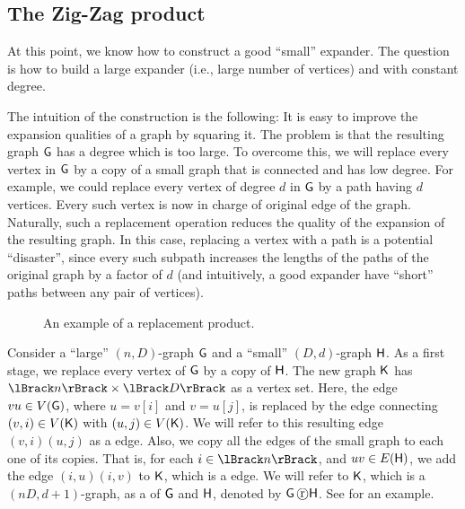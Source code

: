 \subsection{The Zig-Zag product}

At this point, we know how to construct a good ``small'' expander. The
question is how to build a large expander (i.e., large number of
vertices) and with constant degree.

The intuition of the construction is the following: It is easy to
improve the expansion qualities of a graph by squaring it. The problem
is that the resulting graph $\mathsf{G}$ has a degree which is too
large. To overcome this, we will replace every vertex in $\mathsf{G}$ by a
copy of a small graph that is connected and has low degree. For
example, we could replace every vertex of degree $d$ in $\mathsf{G}$ by a
path having $d$ vertices. Every such vertex is now in charge of
original edge of the graph. Naturally, such a replacement operation
reduces the quality of the expansion of the resulting graph. In this
case, replacing a vertex with a path is a potential ``disaster'',
since every such subpath increases the lengths of the paths of the
original graph by a factor of $d$ (and intuitively, a good expander
have ``short'' paths between any pair of vertices).

\begin{figure}[t]
    \centering
    \caption{An example of a replacement product.}
\end{figure}


Consider a ``large'' $(n,D)$-graph $\mathsf{G}$ and a ``small'' $(D,d)$-graph
$\mathsf{H}$. As a first stage, we replace every vertex of $\mathsf{G}$ by a
copy of $\mathsf{H}$.  The new graph $\mathsf{K}$ has
$\RangeI{n}\times\RangeI{D}$ as a vertex set.  Here, the edge
$v u \in V(\mathsf{G})$, where $u=v[i]$ and $v=u[j]$, is replaced by the edge
connecting $(v,i) \in V(\mathsf{K})$ with $(u,j) \in V(\mathsf{K})$. We will refer
to this resulting edge $(v,i)(u,j)$ as a 
edge. Also, we copy all the edges of the small graph to each one of its
copies. That is, for each $i\in \RangeI{n}$, and $uv \in E(\mathsf{H})$, we add
the edge $(i,u) (i,v)$ to $\mathsf{K}$, which is a
 edge. We will refer to $\mathsf{K}$, which is
a $(nD, d+1)$-graph, as a  of $\mathsf{G}$ and $\mathsf{H}$, denoted
by $\mathsf{G} \, \text{\textcircled{r}} \mathsf{H}$. See  for an example.


